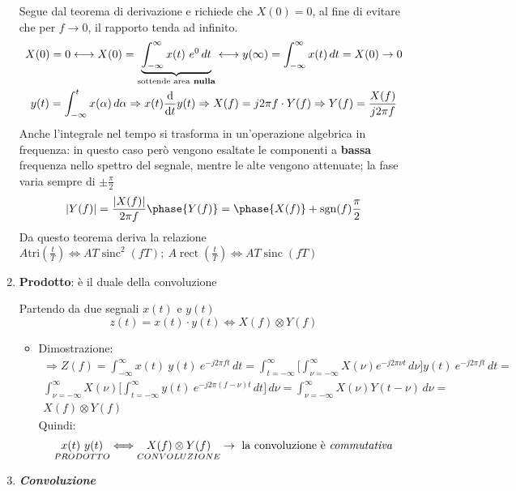 \documentclass[
  paper=a4,
  ,captions=tableheading
]{scrartcl}
\providecommand{\tightlist}{%
  \setlength{\itemsep}{0pt}\setlength{\parskip}{0pt}}
\begin{document}
\begin{enumerate}
  Segue dal teorema di derivazione e richiede che \(X(0)=0\), al fine di
  evitare che per \(f\to 0\), il rapporto tenda ad infinito.
  \begin{gather*}
  X(0)= 0 \longleftrightarrow X(0)=\underbrace{\int_{-\infty}^{\infty}x(t) \ e^{0}\,dt}_{\text{sottende area} \textbf{ nulla}} \longleftrightarrow y(\infty) = \int_{-\infty}^{\infty} x(t)\,dt = X(0) \to 0 \\ y(t) = \int_{-\infty}^{t} x(\alpha) \,d\alpha \Rightarrow x(t) \odv{}{t}y(t) \Rightarrow X(f)=j2\pi f\cdot Y(f) \Rightarrow Y(f) = \frac{X(f)}{j2\pi f}
  \end{gather*} Anche l'integrale nel tempo si trasforma in
  un'operazione algebrica in frequenza: in questo caso però vengono
  esaltate le componenti a \textbf{bassa} frequenza nello spettro del
  segnale, mentre le alte vengono attenuate; la fase varia sempre di
  \(\pm \frac{\pi}{2}\) \[
  |Y(f)| = \frac{|X(f)|}{2\pi f} \\ \phase{Y(f)} = \phase{X(f)} + \text{sgn}(f)\frac{\pi}{2}
  \] Da questo teorema deriva la relazione
  \(A \text{tri}(\frac{t}{T})\Longleftrightarrow AT\mathop{\mathrm{sinc}}^{2}(fT); \ A\mathop{\mathrm{rect}}(\frac{t}{T})\Longleftrightarrow AT\mathop{\mathrm{sinc}}(fT)\)
\item
  \textbf{Prodotto}: è il duale della convoluzione

  Partendo da due segnali \(x(t)\) e \(y(t)\) \[
  z(t)=x(t)\cdot y(t) \Longleftrightarrow X(f) \otimes Y(f)
  \]

  \begin{itemize}
  \tightlist
  \item
    Dimostrazione: \begin{gather*}
    \Rightarrow Z(f) =  \int_{-\infty}^{\infty}x(t)\ y(t)\ e^{-j2\pi ft}\,dt = \int_{t=-\infty}^{\infty} \Big[ \int_{\nu = -\infty}^{\infty} X(\nu) e^{-j2\pi \nu t} \,d\nu \Big ] y(t)\ e^{-j2\pi ft}\,dt= \\ \int_{\nu=-\infty}^{\infty} X(\nu) \Big[ \int_{t = -\infty}^{\infty}  y(t)\ e^{-j2\pi (f-\nu)t}\,dt \Big ] \,d\nu =  \int_{\nu = -\infty}^{\infty} X(\nu) Y(t-\nu) \,d\nu = \\ X(f) \otimes Y(f)
    \end{gather*} Quindi: \[
    \underset{PRODOTTO}{x(t) \ y(t)} \Longleftrightarrow \underset{CONVOLUZIONE}{X(f)\otimes Y(f)} \to \text{ la convoluzione è \textit{commutativa}}
    \]
  \end{itemize}
\item
  \textbf{\emph{Convoluzione}}


\end{enumerate}
\end{document}
